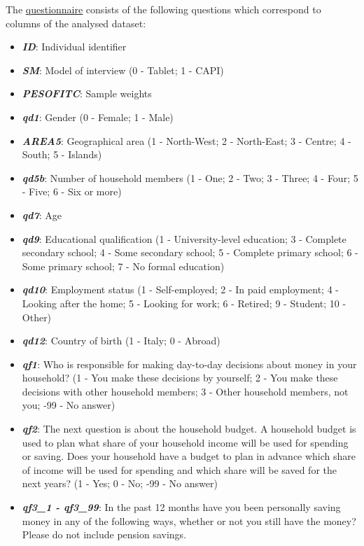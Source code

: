 \documentclass[a4paper,11pt]{article}
\begin{document}
The \href{https://www.bancaditalia.it/statistiche/tematiche/indagini-famiglie-imprese/alfabetizzazione/Data-description.pdf?language_id=1}{questionnaire} consists of the following questions which correspond to columns of the analysed dataset:

\begin{itemize}
    \item \textit{\textbf{ID}}: Individual identifier
    \item \textit{\textbf{SM}}: Model of interview (0 - Tablet; 1 - CAPI)
    \item \textit{\textbf{PESOFITC}}: Sample weights
    \item \textit{\textbf{qd1}}: Gender (0 - Female; 1 - Male)
    \item \textit{\textbf{AREA5}}: Geographical area (1 - North-West; 2 - North-East; 3 - Centre; 4 - South; 5 - Islands)
    \item \textit{\textbf{qd5b}}: Number of household members (1 - One; 2 - Two; 3 -  Three; 4 - Four; 5 - Five; 6 - Six or more)
    \item \textit{\textbf{qd7}}: Age 
    \item \textit{\textbf{qd9}}: Educational qualification (1 - University-level education; 3 - Complete secondary school; 4 - Some secondary school; 5 - Complete primary school; 6 - Some primary school; 7 - No formal education)
    \item \textit{\textbf{qd10}}: Employment status (1 - Self-employed; 2 - In paid employment; 4 - Looking after the home; 5 - Looking for work; 6 - Retired; 9 - Student; 10 - Other)
    \item \textit{\textbf{qd12}}: Country of birth (1 - Italy; 0 - Abroad)
    \item \textit{\textbf{qf1}}: Who is responsible for making day-to-day decisions about money in your household? (1 - You make these decisions by yourself; 2 - You make these decisions with other household members; 3 - Other household members, not you; -99 - No answer)
    \item \textit{\textbf{qf2}}: The next question is about the household budget. A household budget is used to plan what share of your household income will be used for spending or saving. Does your household have a budget to plan in advance which share of income will be used for spending and which share will be saved for the next years? (1 - Yes; 0 - No; -99 - No answer) 
    \item \textit{\textbf{qf3\_1 - qf3\_99}}: In the past 12 months have you been personally saving money in any of the following ways, whether or not you still have the money? Please do not include pension savings.

\end{itemize}
\end{document}
